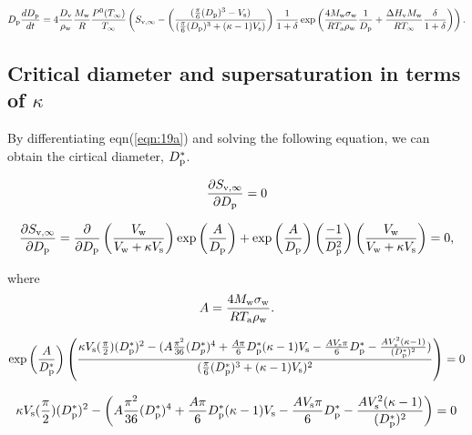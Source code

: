 \documentclass[12pt]{article}
\begin{document}
\begin{equation}\label{eqn:22b}
D_{\rm p}\frac{dD_{\rm p}}{dt}=4 \frac{D_{\rm v}}{\rho_{\rm w}}\frac{M_{\rm w}}{R} \frac{P^{\rm 0}(T_{\infty})}{T_{\infty}}\left(S_{\rm v, \infty} - \left(\frac{(\frac{\pi}{6}(D_{\rm p})^{3}-V_{\rm s}) }{(\frac{\pi}{6}(D_{\rm p})^{3}+(\kappa-1)V_{\rm s})}\right) \frac{1}{1+\delta} \exp \left(\frac{4 M_{\rm w}\sigma_{\rm w}}{R T_{\rm a} \rho_{\rm w}} \frac{1}{D_{\rm p}}+\frac{\Delta H_{\rm v} M_{\rm w}}{R T_{\infty}} \frac{\delta}{1+\delta}\right)\right).
\end{equation}


\subsection{Critical diameter and supersaturation in terms of $\kappa$}

By differentiating eqn(\ref{eqn:19a}) and solving the following equation, we can obtain the cirtical diameter, $D_{\rm p}^{*}$.

\begin{equation}\label{eqn:19c}
\frac{\partial S_{\rm v, \infty}}{\partial D_{\rm p}}=0
\end{equation}

\begin{equation}\label{eqn:19d}
\frac{\partial S_{\rm v, \infty}}{\partial D_{\rm p}}= \frac{\partial}{\partial D_{\rm p}} \left( \frac{V_{\rm w}}{V_{\rm w}+\kappa V_{\rm s}}\right) \exp{\left(\frac{A}{D_{\rm p}}\right)}+\exp{\left(\frac{A}{D_{\rm p}}\right)} \left(\frac{-1}{D_{\rm p}^{2}}\right) \left(\frac{V_{\rm w}}{V_{\rm w}+\kappa V_{\rm s}} \right)=0,
\end{equation}

where 
\begin{equation}\label{eqn:19e}
A=\frac{4M_{\rm w}\sigma_{\rm w}}{RT_{\rm a}\rho_{\rm w}}.
\end{equation}


\begin{equation}\label{eqn:20}
\exp{\left(\frac{A}{D_{\rm p}^{*}}\right)} \left( \frac{\kappa V_{\rm s} (\frac{\pi}{2}) (D_{\rm p}^{*})^2-(A\frac{\pi^{2}}{36}(D_{p}^{*})^4+\frac{A\pi}{6}D_{\rm p}^{*}(\kappa-1)V_{\rm s}-\frac{AV_{\rm s}\pi}{6}D_{\rm p}^{*}-\frac{AV_{s}^2 (\kappa-1)}{(D_{\rm p}^{*})^2})} {(\frac{\pi}{6}(D_{\rm p}^{*})^{3}+(\kappa-1)V_{\rm s})^{2}} \right)=0 
\end{equation}

\begin{equation}\label{eqn:21}
 \kappa V_{\rm s} (\frac{\pi}{2}) (D_{\rm p}^{*})^2-\left(A\frac{\pi^{2}}{36}(D_{\rm p}^{*})^4+\frac{A\pi}{6}D_{\rm p}^{*}(\kappa-1)V_{\rm s}-\frac{AV_{\rm s}\pi}{6}D_{\rm p}^{*}-\frac{AV_{\rm s}^2 (\kappa-1)}{(D_{\rm p}^{*})^2}\right)=0
\end{equation}
\end{document}
